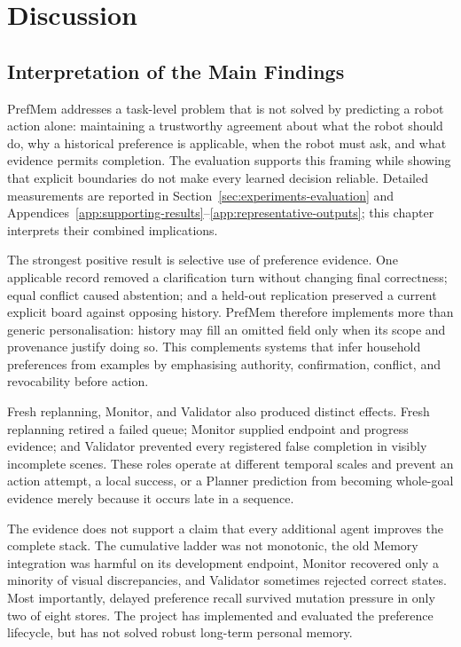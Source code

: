 \documentclass{article}
\begin{document}
\section{Discussion}
\label{sec:discussion}

\subsection{Interpretation of the Main Findings}
\label{subsec:discussion-findings}

PrefMem addresses a task-level problem that is not solved by predicting a robot
action alone: maintaining a trustworthy agreement about what the robot should
do, why a historical preference is applicable, when the robot must ask, and
what evidence permits completion. The evaluation supports this framing while
showing that explicit boundaries do not make every learned decision reliable.
Detailed measurements are reported in Section~\ref{sec:experiments-evaluation}
and Appendices~\ref{app:supporting-results}--\ref{app:representative-outputs};
this chapter interprets their combined implications.

The strongest positive result is selective use of preference evidence. One
applicable record removed a clarification turn without changing final
correctness; equal conflict caused abstention; and a held-out replication
preserved a current explicit board against opposing history. PrefMem therefore
implements more than generic personalisation: history may fill an omitted field
only when its scope and provenance justify doing so. This complements systems
that infer household preferences from examples
\parencite{wu2023tidybot,wang2024apricot} by emphasising authority, confirmation,
conflict, and revocability before action.

Fresh replanning, Monitor, and Validator also produced distinct effects. Fresh
replanning retired a failed queue; Monitor supplied endpoint and progress
evidence; and Validator prevented every registered false completion in visibly
incomplete scenes. These roles operate at different temporal scales and prevent
an action attempt, a local success, or a Planner prediction from becoming
whole-goal evidence merely because it occurs late in a sequence.

The evidence does not support a claim that every additional agent improves the
complete stack. The cumulative ladder was not monotonic, the old Memory
integration was harmful on its development endpoint, Monitor recovered only a
minority of visual discrepancies, and Validator sometimes rejected correct
states. Most importantly, delayed preference recall survived mutation pressure
in only two of eight stores. The project has implemented and evaluated the
preference lifecycle, but has not solved robust long-term personal memory.
\end{document}
